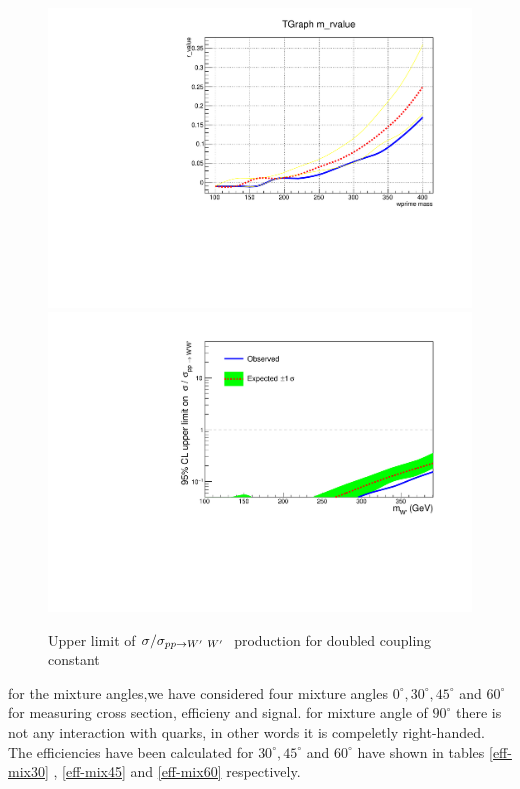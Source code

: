 \begin{figure}[!ht]
\centering
\includegraphics*[width=.45\textwidth]{figs/mixtwice.pdf}
\hspace{3mm}
\includegraphics*[width=.45\textwidth]{figs/mixtwiceb.pdf}
\caption{Upper limit of $\sigma/\sigma_{pp \rightarrow W^\prime~ W^\prime~}$ production for doubled coupling constant}
\label{fig:mixtwice}
\end{figure}


for the mixture angles,we have considered four mixture angles $0^\circ, 30^\circ, 45^\circ$ and $60^\circ$ for measuring cross section, efficieny and signal. for mixture angle of $90^\circ$ there is not any interaction with quarks, in other words it is compeletly right-handed. The efficiencies have been calculated for  $30^\circ, 45^\circ$ and $60^\circ$ have shown in tables \ref{eff-mix30} , \ref{eff-mix45} and \ref{eff-mix60} respectively.

